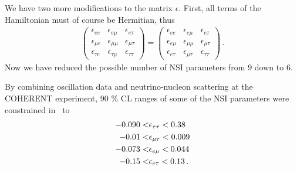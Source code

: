 We have two more modifications to the matrix $\epsilon$. First, all terms of the Hamiltonian must of course be Hermitian, thus
\begin{align}
    \begin{pmatrix}
        \epsilon_{ee} & \epsilon_{e\mu} & \epsilon_{e\tau}  \\
        \epsilon_{\mu e} & \epsilon_{\mu\mu} & \epsilon_{\mu\tau}  \\
        \epsilon_{\tau e} & \epsilon_{\tau\mu} & \epsilon_{\tau\tau}
    \end{pmatrix} =
    \begin{pmatrix}
        \epsilon_{ee} & \epsilon_{e\mu} & \epsilon_{e\tau}  \\
        \epsilon_{e \mu} & \epsilon_{\mu\mu} & \epsilon_{\mu\tau}  \\
        \epsilon_{e\tau} & \epsilon_{\mu\tau} & \epsilon_{\tau\tau}
    \end{pmatrix}\,.
\end{align}
Now we have reduced the possible number of NSI parameters from 9 down to 6. 

By combining oscillation data and neutrino-nucleon scattering at the COHERENT experiment, 90 \% CL ranges of some of 
the NSI parameters were constrained in~\cite{coherent} to
\begin{align}\label{eq:coherentbounds}
    -0.090 < &\epsilon_{\tau\tau} < 0.38 \nonumber \\
    -0.01 < &\epsilon_{\mu\tau} < 0.009 \nonumber \\
    -0.073 < &\epsilon_{e\mu} < 0.044 \nonumber \\
    -0.15 < &\epsilon_{e\tau} < 0.13\,.
\end{align}


